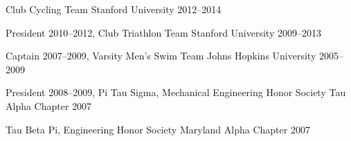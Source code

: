 
\begin{cvhonors}
  \cvhonor%
    {}
    {Club Cycling Team}
    {Stanford University}
    {2012--2014}

  \cvhonor%
    {President}
    {2010--2012, Club Triathlon Team}
    {Stanford University}
    {2009--2013}

  \cvhonor%
    {Captain}
    {2007--2009, Varsity Men's Swim Team}
    {Johns Hopkins University}
    {2005--2009}

  \cvhonor%
    {President}
    {2008--2009, Pi Tau Sigma, Mechanical Engineering Honor Society}
    {Tau Alpha Chapter}
    {2007}

  \cvhonor%
    {}
    {Tau Beta Pi, Engineering Honor Society}
    {Maryland Alpha Chapter}
    {2007}
\end{cvhonors}
